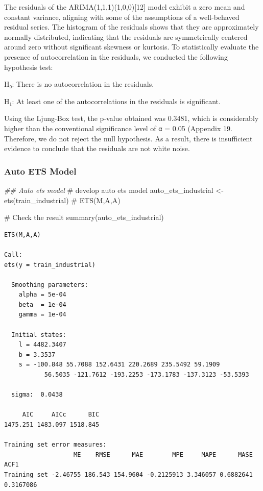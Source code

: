 \documentclass[
  letterpaper,
  DIV=11,
  numbers=noendperiod]{scrartcl}
\newenvironment{Shaded}{\begin{snugshade}}{\end{snugshade}}
\newcommand{\CommentTok}[1]{\textcolor[rgb]{0.37,0.37,0.37}{#1}}
\newcommand{\DocumentationTok}[1]{\textcolor[rgb]{0.37,0.37,0.37}{\textit{#1}}}
\newcommand{\FunctionTok}[1]{\textcolor[rgb]{0.28,0.35,0.67}{#1}}
\newcommand{\NormalTok}[1]{\textcolor[rgb]{0.00,0.23,0.31}{#1}}
\newcommand{\OtherTok}[1]{\textcolor[rgb]{0.00,0.23,0.31}{#1}}
\begin{document}
The residuals of the ARIMA(1,1,1)(1,0,0){[}12{]} model exhibit a zero
mean and constant variance, aligning with some of the assumptions of a
well-behaved residual series. The histogram of the residuals shows that
they are approximately normally distributed, indicating that the
residuals are symmetrically centered around zero without significant
skewness or kurtosis. To statistically evaluate the presence of
autocorrelation in the residuals, we conducted the following hypothesis
test:

H₀: There is no autocorrelation in the residuals.

H₁: At least one of the autocorrelations in the residuals is
significant.

Using the Ljung-Box test, the p-value obtained was 0.3481, which is
considerably higher than the conventional significance level of α = 0.05
(Appendix 19. Therefore, we do not reject the null hypothesis. As a
result, there is insufficient evidence to conclude that the residuals
are not white noise.

\subsubsection{Auto ETS Model}\label{auto-ets-model}

\begin{Shaded}
\begin{Highlighting}[]
\DocumentationTok{\#\# Auto ets model}
\CommentTok{\# develop auto ets model}
\NormalTok{auto\_ets\_industrial }\OtherTok{\textless{}{-}} \FunctionTok{ets}\NormalTok{(train\_industrial) }\CommentTok{\# ETS(M,A,A)}

\CommentTok{\# Check the result}
\FunctionTok{summary}\NormalTok{(auto\_ets\_industrial)}
\end{Highlighting}
\end{Shaded}

\begin{verbatim}
ETS(M,A,A) 

Call:
ets(y = train_industrial)

  Smoothing parameters:
    alpha = 5e-04 
    beta  = 1e-04 
    gamma = 1e-04 

  Initial states:
    l = 4482.3407 
    b = 3.3537 
    s = -100.848 55.7088 152.6431 220.2689 235.5492 59.1909
           56.5035 -121.7612 -193.2253 -173.1783 -137.3123 -53.5393

  sigma:  0.0438

     AIC     AICc      BIC 
1475.251 1483.097 1518.845 

Training set error measures:
                   ME    RMSE      MAE        MPE     MAPE      MASE      ACF1
Training set -2.46755 186.543 154.9604 -0.2125913 3.346057 0.6882641 0.3167086
\end{verbatim}
\end{document}
